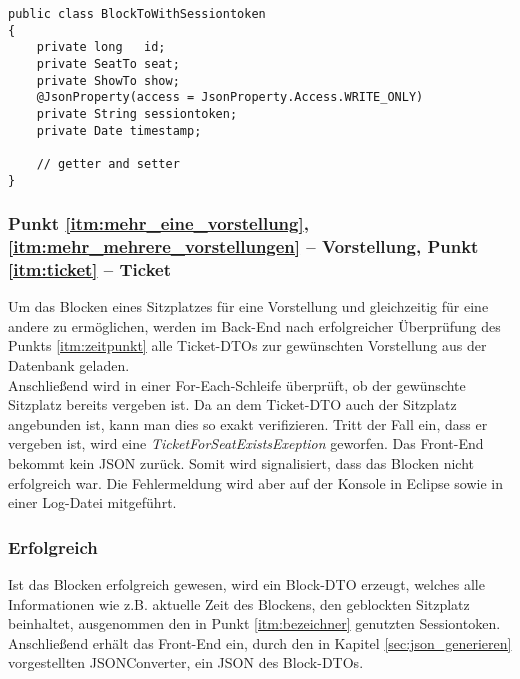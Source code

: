 \begin{lstlisting}[style=lstJava]
public class BlockToWithSessiontoken
{
	private long   id;
	private SeatTo seat;
	private ShowTo show;
	@JsonProperty(access = JsonProperty.Access.WRITE_ONLY)
	private String sessiontoken;
	private Date timestamp;
		
	// getter and setter
}
\end{lstlisting}
\label{lst:jsonproperty}

\subsubsection*{Punkt \ref{itm:mehr_eine_vorstellung}, \ref{itm:mehr_mehrere_vorstellungen} -- Vorstellung, Punkt \ref{itm:ticket} -- Ticket}
\label{ssssec:Vorstellung}
Um das Blocken eines Sitzplatzes für eine Vorstellung und gleichzeitig für eine andere zu ermöglichen, werden im Back-End nach erfolgreicher Überprüfung des Punkts \ref{itm:zeitpunkt} alle Ticket-\acp{DTO} zur gewünschten Vorstellung aus der Datenbank geladen. \\
Anschließend wird in einer For-Each-Schleife überprüft, ob der gewünschte Sitzplatz bereits vergeben ist. Da an dem Ticket-\acs{DTO} auch der Sitzplatz angebunden ist, kann man dies so exakt verifizieren. Tritt der Fall ein, dass er vergeben ist, wird eine \textit{TicketForSeatExistsExeption} geworfen. Das Front-End bekommt kein \acs{JSON} zurück. Somit wird signalisiert, dass das Blocken nicht erfolgreich war. Die Fehlermeldung wird aber auf der Konsole in Eclipse sowie in einer Log-Datei mitgeführt. 

\subsubsection*{Erfolgreich}
Ist das Blocken erfolgreich gewesen, wird ein Block-\acs{DTO} erzeugt, welches alle Informationen wie z.B. aktuelle Zeit des Blockens, den geblockten Sitzplatz beinhaltet, ausgenommen den in Punkt \ref{itm:bezeichner} genutzten Sessiontoken. Anschließend erhält das Front-End ein, durch den in Kapitel \vref{sec:json_generieren} vorgestellten JSONConverter, ein \acs{JSON} des Block-\acp{DTO}. 